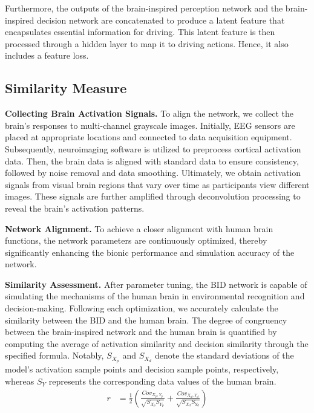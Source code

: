 Furthermore, the outputs of the brain-inspired perception network and the brain-inspired decision network are concatenated to produce a latent feature that encapsulates essential information for driving. This latent feature is then processed through a hidden layer to map it to driving actions. Hence, it also includes a feature loss.
\subsection{Similarity Measure}
\hspace{1pc}\textbf{\textsf{Collecting Brain Activation Signals.}} To align the network, we collect the brain's responses to multi-channel grayscale images. Initially, EEG sensors are placed at appropriate locations and connected to data acquisition equipment. Subsequently, neuroimaging software is utilized to preprocess cortical activation data. Then, the brain data is aligned with standard data to ensure consistency, followed by noise removal and data smoothing. Ultimately, we obtain activation signals from visual brain regions that vary over time as participants view different images. These signals are further amplified through deconvolution processing to reveal the brain's activation patterns.

\textbf{\textsf{Network Alignment.}} To achieve a closer alignment with human brain functions, the network parameters are continuously optimized, thereby significantly enhancing the bionic performance and simulation accuracy of the network.

\textbf{\textsf{Similarity Assessment.}} After parameter tuning, the BID network is capable of simulating the mechanisms of the human brain in environmental recognition and decision-making. Following each optimization, we accurately calculate the similarity between the BID and the human brain. The degree of congruency between the brain-inspired network and the human brain is quantified by computing the average of activation similarity and decision similarity through the specified formula. Notably, $S_{X_{p}}$ and $S_{X_{d}}$ denote the standard deviations of the model's activation sample points and decision sample points, respectively, whereas $S_{Y}$ represents the corresponding data values of the human brain.
\begin{align}
	r & = \frac{1}{2}\left(\frac{Cov_{X_{p},Y_{p}}}{\sqrt{S_{X_{p}} S_{Y_{p}}}}+\frac{Cov_{X_{d},Y_{d}}}{\sqrt{S_{X_{d}} S_{Y_{d}}}}\right)
\end{align}
